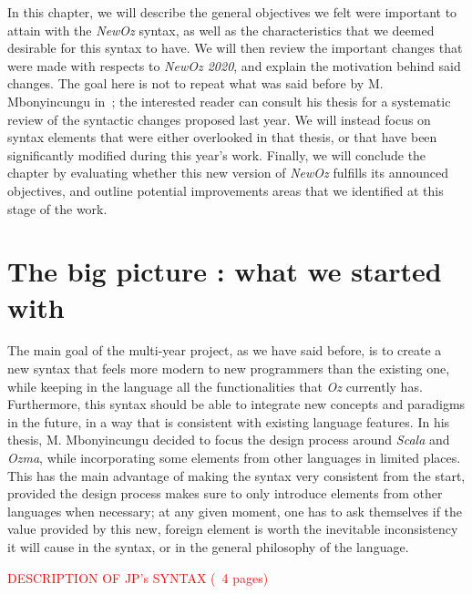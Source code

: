 
In this chapter, we will describe the general objectives we felt were important to attain with the \textit{NewOz} syntax, as well as the characteristics that we deemed desirable for this syntax to have.
We will then review the important changes that were made  with respects to \textit{NewOz 2020}, and explain the motivation behind said changes.
The goal here is not to repeat what was said before by M. Mbonyincungu in~\cite{jpthesis};
the interested reader can consult his thesis for a systematic review of the syntactic changes proposed last year.
We will instead focus on syntax elements that were either overlooked in that thesis, or that have been significantly modified during this year's work.
Finally, we will conclude the chapter by evaluating whether this new version of \textit{NewOz} fulfills its announced objectives, and outline potential improvements areas that we identified at this stage of the work.\newline

\section{The big picture : what we started with}\label{sec:ch2-goal}
The main goal of the multi-year project, as we have said before, is to create a new syntax that feels more modern to new programmers than the existing one, while keeping in the language all the functionalities that \textit{Oz} currently has.
Furthermore, this syntax should be able to integrate new concepts and paradigms in the future, in a way that is consistent with existing language features.
In his thesis, M. Mbonyincungu decided to focus the design process around \textit{Scala} and \textit{Ozma}, while incorporating some elements from other languages in limited places.
This has the main advantage of making the syntax very consistent from the start, provided the design process makes sure to only introduce elements from other languages when necessary;
at any given moment, one has to ask themselves if the value provided by this new, foreign element is worth the inevitable inconsistency it will cause in the syntax, or in the general philosophy of the language.\newline

\textcolor{red}{DESCRIPTION OF JP's SYNTAX (~4 pages)}\newline

